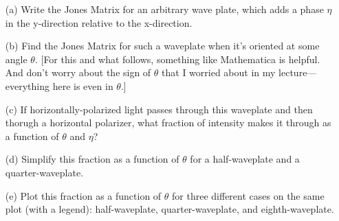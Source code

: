 \documentclass[11pt]{hmcpset}
\begin{document}
\begin{problem}
	\begin{enumerate}
		\item[(a)] Write the Jones Matrix for an arbitrary wave plate, which adds a phase $\eta$ in the y-direction relative to the x-direction.
		\item[(b)] Find the Jones Matrix for such a waveplate when it's oriented at some angle $\theta$. [For this and what follows, something like Mathematica is helpful. And don't worry about the sign of $\theta$ that I worried about in my lecture---everything here is even in $\theta$.]
		\item[(c)] If horizontally-polarized light passes through this waveplate and then thorugh a horizontal polarizer, what fraction of intensity makes it through as a function of $\theta$ and $\eta$?
		\item[(d)] Simplify this fraction as a function of $\theta$ for a half-waveplate and a quarter-waveplate.
		\item[(e)] Plot this fraction as a function of $\theta$ for three different cases on the same plot (with a  legend): half-waveplate, quarter-waveplate, and eighth-waveplate.
	\end{enumerate}
\end{problem}

\begin{solution}
	\vfill
\end{solution}
\pagebreak
\end{document}
